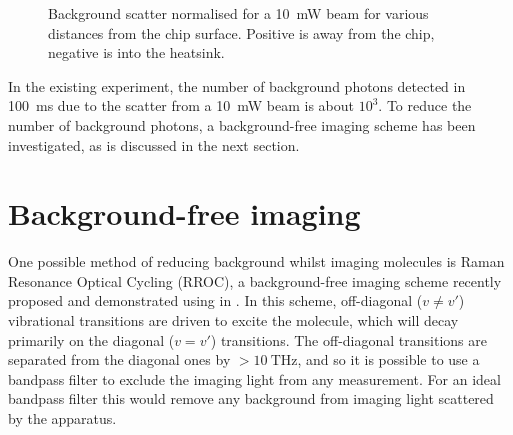 \begin{figure}
  \centering
  \caption[Background scatter from the chip]{
    Background scatter normalised for a \SI{10}{\milli\watt} beam for
  various distances from the chip surface. Positive is away from the chip,
negative is into the heatsink.}
  \label{exper:fig:scatter}
\end{figure}

In the existing experiment, the number of background photons detected in
\SI{100}{\milli\second} due to the scatter from a \SI{10}{\milli\watt} beam is
about $10^3$. To reduce the number of background photons, a background-free
imaging scheme has been investigated, as is discussed in the next section.

\section{Background-free imaging}
\label{exper:bgf}

One possible method of reducing background whilst imaging molecules is Raman
Resonance Optical Cycling (RROC), a background-free imaging scheme recently
proposed and demonstrated using \SrF{} in . In this scheme,
off-diagonal ($v\neq v'$) vibrational transitions are driven to excite the
molecule, which will decay primarily on the diagonal ($v=v'$) transitions. The
off-diagonal transitions are separated from the diagonal ones by
$>\SI{10}{\tera\hertz}$, and so it is possible to use a bandpass filter to
exclude the imaging light from any measurement. For an ideal bandpass filter
this would remove any background from imaging light scattered by the apparatus.

